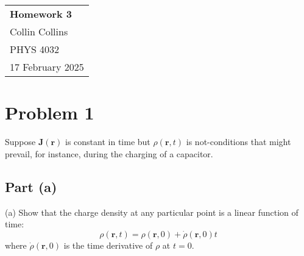 \documentclass[a4paper,12pt]{article} %
\begin{document}



\thispagestyle{empty} %

\begin{tabular}{p{15.5cm}} %
{\large \bf Homework 3}
\\ Collin Collins \\
PHYS 4032\\
17 February 2025 \\
\hline %
\end{tabular} %

%
%
%
%
%

\section*{Problem 1}
Suppose $\mathbf{J}(\mathbf{r})$ is constant in time but $\rho(\mathbf{r}, t)$ is not-conditions that might prevail, for instance, during the charging of a capacitor.\\
\subsection*{Part (a)}
(a) Show that the charge density at any particular point is a linear function of time:
$$
\rho(\mathbf{r}, t)=\rho(\mathbf{r}, 0)+\dot{\rho}(\mathbf{r}, 0) t
$$
where $\dot{\rho}(\mathbf{r}, 0)$ is the time derivative of $\rho$ at $t=0$.\\
\end{document}
